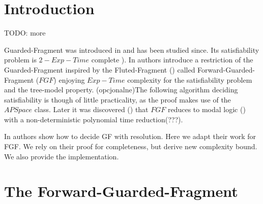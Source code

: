 \documentclass[english, shortabstract]{iithesis}
\author         {Maksymilian Debeściak}
\theoremstyle{definition} \newtheorem{definition}{Definition}[chapter]
\theoremstyle{remark} \newtheorem{remark}[definition]{Observation}
\theoremstyle{plain} \newtheorem{theorem}[definition]{Theorem}
\theoremstyle{plain} \newtheorem{lemma}[definition]{Lemma}
\begin{document}

\chapter{Introduction}
TODO: more

Guarded-Fragment was introduced in \cite{?} and has been studied since. Its satisfiability problem is $2-Exp-Time$ complete \cite{Gradel1997}).
In \cite{BBE, jelia2021} authors introduce a restriction of the Guarded-Fragment inspired by the Fluted-Fragment (\cite{Fluted}) called Forward-Guarded-Fragment ($FGF$) enjoying $Exp-Time$ complexity for the satisfiability problem and the tree-model property. 
(opcjonalne)The following algorithm deciding satisfiability is though of little practicality, as the proof makes use of the $APSpace$ class.
Later it was discovered (\cite{?}) that $FGF$ reduces to modal logic (\cite{modal logic}) with a non-deterministic polynomial time reduction(???). 
\par In \cite{resolution-gf} authors show how to decide GF with resolution. Here we adapt their work for FGF.
We rely on their proof for completeness, but derive new complexity bound. We also provide the implementation.

\chapter{The Forward-Guarded-Fragment}
\end{document}

